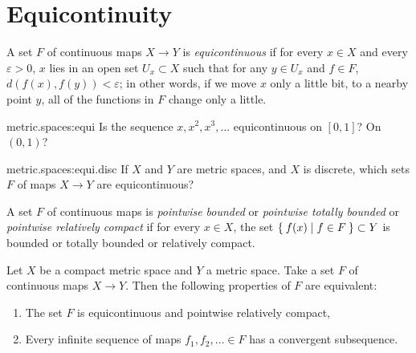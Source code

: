 \section{Equicontinuity}
A set \(F\) of continuous maps \(X \to Y\) is \emph{equicontinuous} if for every \(x \in X\) and every \(\varepsilon > 0\), \(x\) lies in an open set \(U_x \subset X\) such that for any \(y \in U_x\) and \(f \in F\), \(d(f(x),f(y)) < \varepsilon\); in other words, if we move \(x\) only a little bit, to a nearby point \(y\), all of the functions in \(F\) change only a little.
\begin{problem}{metric.spaces:equi}
Is the sequence \(x,x^2,x^3,\dots\) equicontinuous on \([0,1]\)? On \((0,1)\)?
\end{problem}
\begin{problem}{metric.spaces:equi.disc}
If \(X\) and \(Y\) are metric spaces, and \(X\) is discrete, which sets \(F\) of maps \(X \to Y\) are equicontinuous?
\end{problem}
A set \(F\) of continuous maps is \emph{pointwise bounded} or \emph{pointwise totally bounded} or \emph{pointwise relatively compact} if for every \(x \in X\), the set \(\Set{f(x)|f \in F} \subset Y\) is bounded or totally bounded or relatively compact.
\begin{theorem}\label{theorem:Arzela.Ascoli.I}
Let \(X\) be a compact metric space and \(Y\) a metric space. 
Take a set \(F\) of continuous maps \(X \to Y\).
Then the following properties of \(F\) are equivalent:
\begin{enumerate}
\item 
The set \(F\) is equicontinuous and pointwise relatively compact,
\item
Every infinite sequence of maps \(f_1, f_2, \dots \in F\) has a convergent subsequence.
\end{enumerate}
\end{theorem}
